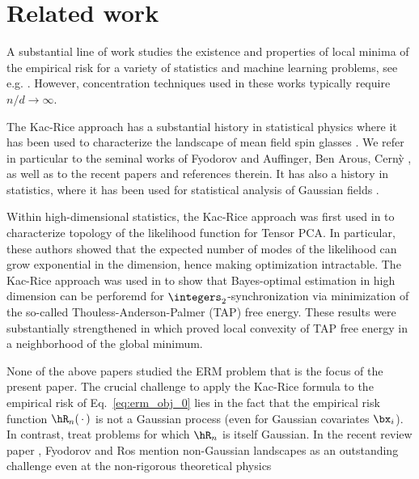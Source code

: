 \section{Related work}
A substantial line of work studies the existence and properties
of local minima of the empirical risk for a variety of statistics 
and machine learning problems, see e.g. 
\cite{mei2018landscape,sun2018geometric,soltanolkotabi2018theoretical}. However,
concentration techniques used in these works typically require $n/d\to\infty$.

The Kac-Rice approach has a substantial history in statistical
physics where it has been used to characterize the landscape of 
mean field spin glasses 
\cite{bray1980metastable}. 
We refer in particular to the seminal works
of Fyodorov \cite{fyodorov2004complexity} and Auffinger, Ben Arous, Cern\`y \cite{auffinger2013random}, as well as to the recent papers
\cite{subag2017complexity,ros2023high} and references therein.
It has also a history in statistics, where it has been used for statistical analysis of Gaussian fields \cite{adler2009random}.

Within high-dimensional statistics, the Kac-Rice approach was first used
in \cite{arous2019landscape} to characterize 
topology of the likelihood function for Tensor PCA. 
In particular, these authors showed that the expected number of modes of the likelihood can grow exponential in the dimension, hence 
making optimization intractable.
The Kac-Rice approach was used in \cite{fan2021tap} to show that Bayes-optimal estimation 
in high dimension can be perforemd for $\integers_{2}$-synchronization via minimization of the so-called Thouless-Anderson-Palmer (TAP) free energy. These results  were substantially strengthened in \cite{celentano2023local} which proved local convexity of TAP free energy in a neighborhood of
the global minimum. 

None of the above papers studied the ERM problem that is the focus of the present paper.
The crucial challenge to apply the Kac-Rice formula to
the empirical risk of Eq.~\eqref{eq:erm_obj_0} lies in the fact that
the empirical risk function $\hR_n(\,\cdot\,)$ is not a Gaussian process
(even for Gaussian covariates $\bx_i$).
In contrast, 
\cite{arous2019landscape,fan2021tap,celentano2023local}
treat problems  for which $\hR_n$ is itself Gaussian.
In the recent review paper \cite{ros2023high}, Fyodorov and Ros 
mention non-Gaussian landscapes as an outstanding challenge even at the non-rigorous theoretical physics

